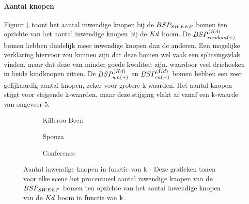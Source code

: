 \paragraph{Aantal knopen} Figuur \ref{fig:k-knopen} toont het aantal inwendige knopen bij de $BSP_{SWEEP}$ bomen ten opzichte van het aantal inwendige knopen bij de $Kd$ boom. De $BSP^{(Kd)}_{random(+)}$ bomen hebben duidelijk meer inwendige knopen dan de anderen. Een mogelijke verklaring hiervoor zou kunnen zijn dat deze bomen wel vaak een splitsingsvlak vinden, maar dat deze van minder goede kwaliteit zijn, waardoor veel driehoeken in beide kindknopen zitten. De $BSP^{(Kd)}_{wn(+)}$ en $BSP^{(Kd)}_{cn(+)}$ bomen hebben een zeer gelijkaardig aantal knopen, zeker voor grotere k-waarden. Het aantal knopen stijgt voor stijgende k-waarden, maar deze stijging vlakt af vanaf een k-waarde van ongeveer 5.


\begin{figure}[h]
  \centering
  \begin{subfigure}[t]{.32\linewidth}
    \centering
{}
\caption{Killeroo Been}
  \end{subfigure}
  \begin{subfigure}[t]{.32\linewidth}
    \centering
{}
\caption{Sponza}
\end{subfigure}
\begin{subfigure}[t]{.32\linewidth}
  \centering
{}
\caption{Conference}
\end{subfigure}
\caption[Aantal inwendige knopen in functie van k]{Aantal inwendige knopen in functie van k - \small Deze grafieken tonen voor elke scene het procentueel aantal inwendige knopen van de $BSP_{SWEEP}$ bomen ten opzichte van het aantal inwendige knopen van de $Kd$ boom in functie van k.}
\label{fig:k-knopen}
\end{figure}

